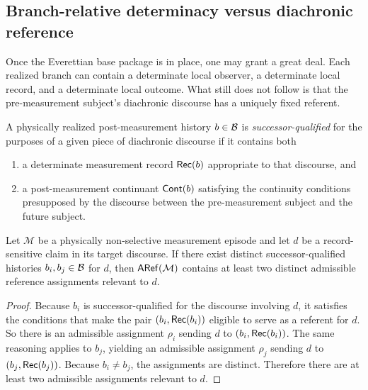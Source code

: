 \subsection{Branch-relative determinacy versus diachronic reference}

Once the Everettian base package is in place, one may grant a great deal. Each realized branch can
contain a determinate local observer, a determinate local record, and a determinate local outcome.
What still does not follow is that the pre-measurement subject's diachronic discourse has a uniquely
fixed referent.

\begin{definition}
A physically realized post-measurement history $b\in\mathcal{B}$ is \emph{successor-qualified} for the
purposes of a given piece of diachronic discourse if it contains both
\begin{enumerate}
    \item a determinate measurement record $\mathsf{Rec}(b)$ appropriate to that discourse, and
    \item a post-measurement continuant $\mathsf{Cont}(b)$ satisfying the continuity conditions presupposed by
    the discourse between the pre-measurement subject and the future subject.
\end{enumerate}
\end{definition}

\begin{lemma}
\label{lem:successorqualified}
Let $\mathcal{M}$ be a physically non-selective measurement episode and let $d$ be a record-sensitive
claim in its target discourse. If there exist distinct successor-qualified histories $b_i,b_j\in\mathcal{B}$ for $d$,
then $\mathsf{ARef}(\mathcal{M})$ contains at least two distinct admissible reference assignments relevant to
$d$.
\end{lemma}

\begin{proof}
Because $b_i$ is successor-qualified for the discourse involving $d$, it satisfies the conditions that
make the pair $(b_i,\mathsf{Rec}(b_i))$ eligible to serve as a referent for $d$. So there is an admissible
assignment $\rho_i$ sending $d$ to $(b_i,\mathsf{Rec}(b_i))$. The same reasoning applies to $b_j$, yielding an
admissible assignment $\rho_j$ sending $d$ to $(b_j,\mathsf{Rec}(b_j))$. Because $b_i\neq b_j$, the
assignments are distinct. Therefore there are at least two admissible assignments relevant to $d$.
\end{proof}

